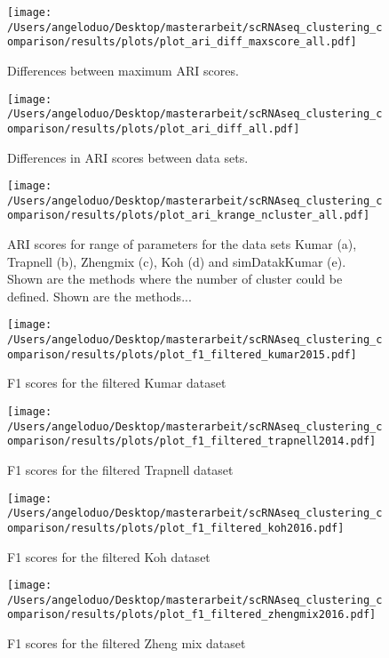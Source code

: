 \documentclass[11pt, a4paper]{article}\usepackage[]{graphicx}\usepackage[]{color}
\begin{document}
\begin{figure}[!h]
\texttt{[image: /Users/angeloduo/Desktop/masterarbeit/scRNAseq\_clustering\_comparison/results/plots/plot\_ari\_diff\_maxscore\_all.pdf]}
\caption{Differences between maximum ARI scores.  }
\label{fig:aridiff1}
\end{figure}

\begin{figure}[!h]
\texttt{[image: /Users/angeloduo/Desktop/masterarbeit/scRNAseq\_clustering\_comparison/results/plots/plot\_ari\_diff\_all.pdf]}
\caption{Differences in ARI scores between  data sets.  }
\label{fig:aridiff1}
\end{figure}



\begin{figure}[!h]
\texttt{[image: /Users/angeloduo/Desktop/masterarbeit/scRNAseq\_clustering\_comparison/results/plots/plot\_ari\_krange\_ncluster\_all.pdf]}
\caption{ARI scores for range of parameters for the data sets Kumar (a), Trapnell (b), Zhengmix (c), Koh (d) and simDatakKumar (e). Shown are the methods where the number of cluster could be defined. Shown are the methods...}
\label{fig:arirangeall}
\end{figure}


\begin{figure}[!h]
\texttt{[image: /Users/angeloduo/Desktop/masterarbeit/scRNAseq\_clustering\_comparison/results/plots/plot\_f1\_filtered\_kumar2015.pdf]}
\caption{F1 scores for the filtered Kumar dataset }
\label{fig:f1kumar}
\end{figure}

\begin{figure}[!h]
\texttt{[image: /Users/angeloduo/Desktop/masterarbeit/scRNAseq\_clustering\_comparison/results/plots/plot\_f1\_filtered\_trapnell2014.pdf]}
\caption{F1 scores for  the filtered Trapnell dataset }
\label{fig:f1trapnell}
\end{figure}

\begin{figure}[!h]
\texttt{[image: /Users/angeloduo/Desktop/masterarbeit/scRNAseq\_clustering\_comparison/results/plots/plot\_f1\_filtered\_koh2016.pdf]}
\caption{F1 scores for the filtered Koh dataset }
\label{fig:f1koh}
\end{figure}

\begin{figure}[!h]
\texttt{[image: /Users/angeloduo/Desktop/masterarbeit/scRNAseq\_clustering\_comparison/results/plots/plot\_f1\_filtered\_zhengmix2016.pdf]}
\caption{F1 scores for the filtered Zheng mix dataset }
\label{fig:f1zheng}
\end{figure}
\end{document}
